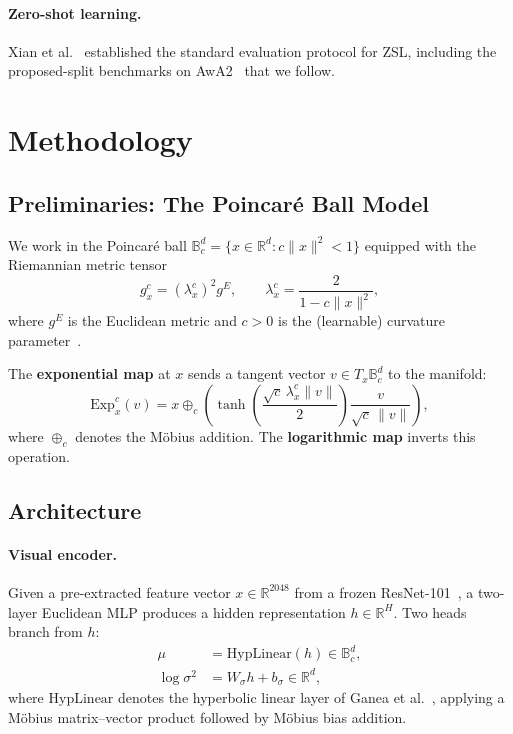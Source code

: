 \documentclass{article}
\newcommand{\R}{\mathbb{R}}
\newcommand{\expmap}{\mathrm{Exp}}
\newcommand{\poinc}{\mathbb{B}^{d}_{c}}
\begin{document}
\paragraph{Zero-shot learning.}
Xian et al.~\cite{xian2019zsl} established the standard evaluation protocol for ZSL, including the proposed-split benchmarks on AwA2~\cite{xian2018awa2} that we follow.

\section{Methodology}\label{sec:method}

\subsection{Preliminaries: The Poincar\'{e} Ball Model}\label{sec:poincare}

We work in the Poincar\'{e} ball $\poinc = \{ x \in \R^d : c\|x\|^2 < 1 \}$ equipped with the Riemannian metric tensor
\begin{equation}
    g_x^c = \left(\lambda_x^c\right)^2 g^E, \qquad \lambda_x^c = \frac{2}{1 - c\|x\|^2},
\end{equation}
where $g^E$ is the Euclidean metric and $c > 0$ is the (learnable) curvature parameter~\cite{ganea2018hyperbolic}.

The \textbf{exponential map} at $x$ sends a tangent vector $v \in T_x\poinc$ to the manifold:
\begin{equation}
    \expmap_x^c(v) = x \oplus_c \left( \tanh\!\left(\frac{\sqrt{c}\,\lambda_x^c \|v\|}{2}\right) \frac{v}{\sqrt{c}\,\|v\|} \right),
\end{equation}
where $\oplus_c$ denotes the M\"{o}bius addition.  The \textbf{logarithmic map} inverts this operation.

\subsection{Architecture}\label{sec:arch}

\paragraph{Visual encoder.}
Given a pre-extracted feature vector $x \in \R^{2048}$ from a frozen ResNet-101~\cite{he2016resnet}, a two-layer Euclidean MLP produces a hidden representation $h \in \R^{H}$.
Two heads branch from $h$:
\begin{align}
    \mu &= \mathrm{HypLinear}(h) \in \poinc, \label{eq:mu} \\
    \log\sigma^2 &= W_\sigma h + b_\sigma \in \R^d, \label{eq:logvar}
\end{align}
where $\mathrm{HypLinear}$ denotes the hyperbolic linear layer of Ganea et al.~\cite{ganea2018hyperbolic}, applying a M\"{o}bius matrix--vector product followed by M\"{o}bius bias addition.
\end{document}
